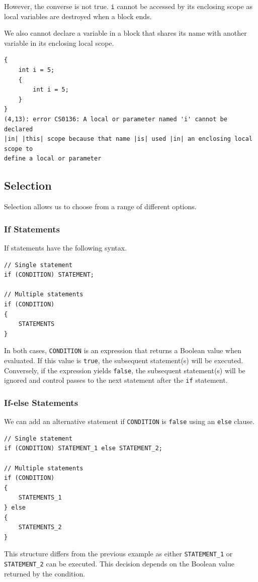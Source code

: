 \documentclass{article}
\def\customlinemarker#1#2{
    \edef\thelstnumber{%
        \unexpanded{%
            \ifnum#1=\value{lstnumber}\relax
              #2%
            \fi}%
        \ifx\thelstnumber\relax\else
        \expandafter\unexpanded\expandafter{\thelstnumber}%
        \fi
    }
}
\begin{document}
However, the converse is not true. \lstinline{i} cannot be accessed by its enclosing scope
as local variables are destroyed when a block ends.

We also cannot declare a variable in a block that shares its name
with another variable in its enclosing local scope.
\begingroup
\let\thelstnumber\relax
\customlinemarker{1}{\$}
\customlinemarker{2}{.}
\customlinemarker{3}{.}
\customlinemarker{4}{.}
\customlinemarker{5}{.}
\customlinemarker{6}{.}
\begin{lstlisting}[escapeinside=||]
{
    int i = 5;
    {
        int i = 5;
    }   
}
(4,13): error CS0136: A local or parameter named 'i' cannot be declared
|in| |this| scope because that name |is| used |in| an enclosing local scope to 
define a local or parameter
\end{lstlisting}
\endgroup
\subsection{Selection}
Selection allows us to choose from a range of different options.
\subsubsection{If Statements}
If statements have the following syntax.
\begin{lstlisting}[numbers=none]
// Single statement
if (CONDITION) STATEMENT;

// Multiple statements
if (CONDITION)
{
    STATEMENTS
}
\end{lstlisting}
In both cases, \lstinline{CONDITION} is an expression that returns a Boolean value %
when evaluated. If this value is \lstinline{true}, the subsequent statement(s) will
be executed. Conversely, if the expression yields \lstinline{false}, the subsequent
statement(s) will be ignored and control passes to the next statement after the \lstinline{if}
statement.
\subsubsection{If-else Statements}
We can add an alternative statement if \lstinline{CONDITION} is \lstinline{false} using an \lstinline{else} %
clause.
\begin{lstlisting}[numbers=none]
// Single statement
if (CONDITION) STATEMENT_1 else STATEMENT_2;

// Multiple statements
if (CONDITION) 
{
    STATEMENTS_1
} else
{
    STATEMENTS_2
}
\end{lstlisting}
This structure differs from the previous example as either \lstinline{STATEMENT_1} or \lstinline{STATEMENT_2}
can be executed. This decision depends on the Boolean value returned by the condition.
\end{document}

